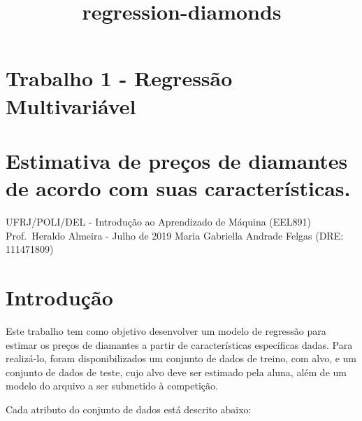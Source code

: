 \documentclass[11pt]{article}
\title{regression-diamonds}
\begin{document}
    
    
    \maketitle
    
    

    
    \hypertarget{trabalho-1---regressuxe3o-multivariuxe1vel}{%
\section{Trabalho 1 - Regressão
Multivariável}\label{trabalho-1---regressuxe3o-multivariuxe1vel}}

\hypertarget{estimativa-de-preuxe7os-de-diamantes-de-acordo-com-suas-caracteruxedsticas.}{%
\section{Estimativa de preços de diamantes de acordo com suas
características.}\label{estimativa-de-preuxe7os-de-diamantes-de-acordo-com-suas-caracteruxedsticas.}}

UFRJ/POLI/DEL - Introdução ao Aprendizado de Máquina (EEL891)\\
Prof.~Heraldo Almeira - Julho de 2019 Maria Gabriella Andrade Felgas
(DRE: 111471809)

    \hypertarget{introduuxe7uxe3o}{%
\section{Introdução}\label{introduuxe7uxe3o}}

    Este trabalho tem como objetivo desenvolver um modelo de regressão para
estimar os preços de diamantes a partir de características específicas
dadas. Para realizá-lo, foram disponibilizados um conjunto de dados de
treino, com alvo, e um conjunto de dados de teste, cujo alvo deve ser
estimado pela aluna, além de um modelo do arquivo a ser submetido à
competição.

Cada atributo do conjunto de dados está descrito abaixo:
\end{document}
